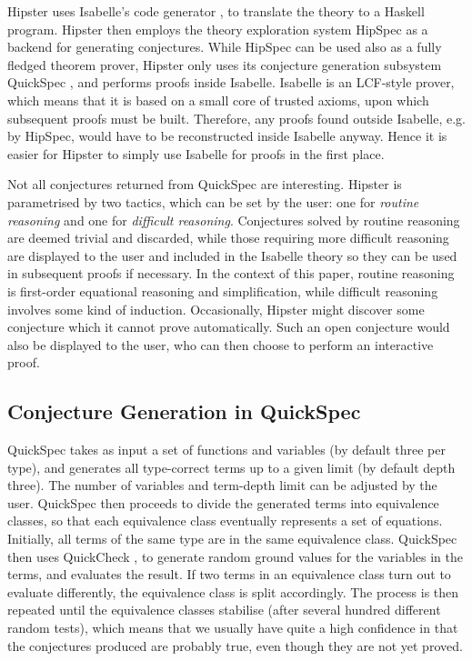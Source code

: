 Hipster uses Isabelle's code generator \cite{codegen2}, to translate the theory to a Haskell program.
%
Hipster then employs the theory exploration system HipSpec as a backend for generating conjectures.
%
While HipSpec can be used also as a fully fledged theorem prover, Hipster only uses its conjecture generation subsystem QuickSpec \cite{quickspec}, and performs proofs inside Isabelle.
%
Isabelle is an LCF-style prover, which means that it is based on a small core of trusted axioms, upon which subsequent proofs must be built.
%
Therefore, any proofs found outside Isabelle, e.g. by HipSpec, would have to be reconstructed inside Isabelle anyway.
%
Hence it is easier for Hipster to simply use Isabelle for proofs in the first place. 

Not all conjectures returned from QuickSpec are interesting.
%
Hipster is parametrised by two tactics, which can be set by the user: one for \emph{routine reasoning} and one for \emph{difficult reasoning}.
%
Conjectures solved by routine reasoning are deemed trivial and discarded, while those requiring more difficult reasoning are displayed to the user and included in the Isabelle theory so they can be used in subsequent proofs if necessary.
%
In the context of this paper, routine reasoning is first-order equational reasoning and simplification, while difficult reasoning involves some kind of induction.
%
Occasionally, Hipster might discover some conjecture which it cannot prove automatically.
%
Such an open conjecture would also be displayed to the user, who can then choose to perform an interactive proof.


\subsection{Conjecture Generation in QuickSpec}
QuickSpec takes as input a set of functions and variables (by default three per type), and generates all type-correct terms up to a given limit (by default depth three).
%
The number of variables and term-depth limit can be adjusted by the user.
%
QuickSpec then proceeds to divide the generated terms into equivalence classes, so that each equivalence class eventually represents a set of equations.
%
Initially, all terms of the same type are in the same equivalence class. QuickSpec then uses QuickCheck \cite{quickcheck}, to generate random ground values for the variables in the terms, and evaluates the result.
%
If two terms in an equivalence class turn out to evaluate differently, the equivalence class is split accordingly.
%
The process is then repeated until the equivalence classes stabilise (after several hundred different random tests), which means that we usually have quite a high confidence in that the conjectures produced are probably true, even though they are not yet proved.  

